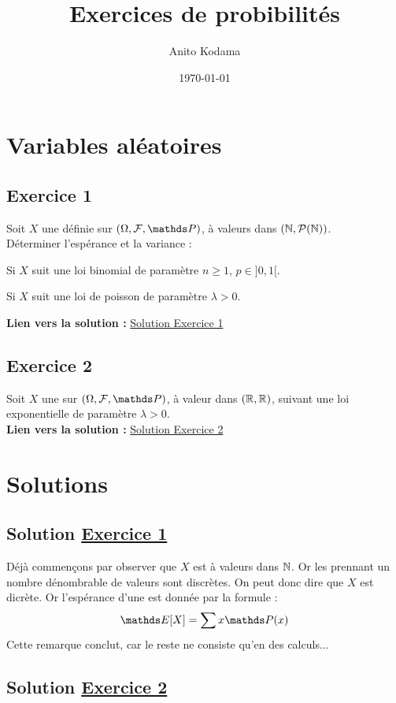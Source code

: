 
\usepackage{hyperref} %

\title{Exercices de probibilités}
\author{Anito Kodama}
\date{\today}


\maketitle

\section*{Variables aléatoires}

\subsection*{Exercice 1}
\label{exo1}
Soit $X$ une \va définie sur $(\Omega, \mathcal{F}, \PP)$, à valeurs dans $(\mathbb{N}, \mathcal{P}(\mathbb{N}))$.\\
Déterminer l'espérance et la variance :
\ben
\item Si $X$ suit une loi binomial de paramètre $n \geq 1$, $p \in ]0,1[$. \item Si $X$ suit une loi de poisson de paramètre $\lambda > 0$.
\een

\noindent
\textbf{Lien vers la solution :} \hyperref[sol1]{Solution Exercice 1}

\vspace{1em}

\subsection*{Exercice 2}
\label{exo2}
Soit $X$ une \va sur $(\Omega, \mathcal{F}, \PP)$, à valeur dans $(\mathbb{R},\mathcal{\mathbb{R}})$, suivant une loi exponentielle de paramètre $\lambda > 0.$\\


\noindent
\textbf{Lien vers la solution :} \hyperref[sol2]{Solution Exercice 2}

\newpage %

\section*{Solutions}

\subsection*{Solution \hyperref[exo1]{Exercice 1}}
\label{sol1}
Déjà commençons par observer que $X$ est à valeurs dans $\mathbb{N}$. Or les \vas prennant un nombre dénombrable de valeurs sont discrètes. On peut donc dire que $X$ est dicrète. Or l'espérance d'une \va est donnée par la formule : $$\E[X] = \sum x \PP(x)$$
Cette remarque conclut, car le reste ne consiste qu'en des calculs...

\vspace{1em}

\subsection*{Solution \hyperref[exo2]{Exercice 2}}
\label{sol2}




